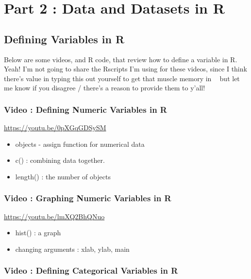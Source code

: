 \documentclass[
  letterpaper,
  DIV=11,
  numbers=noendperiod,
  oneside]{scrreprt}
\begin{document}
\chapter{Part 2 : Data and Datasets in
R}\label{part-2-data-and-datasets-in-r}

\section{Defining Variables in R}\label{defining-variables-in-r}

Below are some videos, and R code, that review how to define a variable
in R. Yeah! I'm not going to share the Rscripts I'm using for these
videos, since I think there's value in typing this out yourself to get
that muscle memory in 💪🤘 but let me know if you disagree / there's a
reason to provide them to y'all!

\subsection{Video : Defining Numeric Variables in
R}\label{video-defining-numeric-variables-in-r}

\url{https://youtu.be/0pXGqGDSySM}

\begin{itemize}
\item
  objects - assign function for numerical data
\item
  c() : combining data together.
\item
  length() : the number of objects
\end{itemize}

\subsection{Video : Graphing Numeric Variables in
R}\label{video-graphing-numeric-variables-in-r}

\url{https://youtu.be/lmXQ2BhQNuo}

\begin{itemize}
\item
  hist() : a graph
\item
  changing arguments : xlab, ylab, main
\end{itemize}

\subsection{Video : Defining Categorical Variables in
R}\label{video-defining-categorical-variables-in-r}
\end{document}
